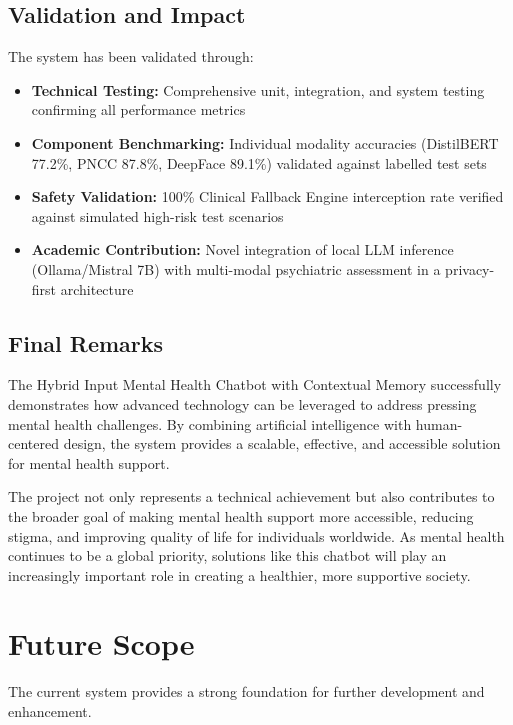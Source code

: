 \documentclass[11pt]{report}
\begin{document}
\section{Validation and Impact}
The system has been validated through:
\begin{itemize}
    \item \textbf{Technical Testing:} Comprehensive unit, integration, and system testing confirming all performance metrics
    \item \textbf{Component Benchmarking:} Individual modality accuracies (DistilBERT 77.2\%, PNCC 87.8\%, DeepFace 89.1\%) validated against labelled test sets
    \item \textbf{Safety Validation:} 100\% Clinical Fallback Engine interception rate verified against simulated high-risk test scenarios
    \item \textbf{Academic Contribution:} Novel integration of local LLM inference (Ollama/Mistral 7B) with multi-modal psychiatric assessment in a privacy-first architecture
\end{itemize}

\section{Final Remarks}
The Hybrid Input Mental Health Chatbot with Contextual Memory successfully demonstrates how advanced technology can be leveraged to address pressing mental health challenges. By combining artificial intelligence with human-centered design, the system provides a scalable, effective, and accessible solution for mental health support.

The project not only represents a technical achievement but also contributes to the broader goal of making mental health support more accessible, reducing stigma, and improving quality of life for individuals worldwide. As mental health continues to be a global priority, solutions like this chatbot will play an increasingly important role in creating a healthier, more supportive society.

\chapter{Future Scope}
The current system provides a strong foundation for further development and enhancement.
\end{document}
